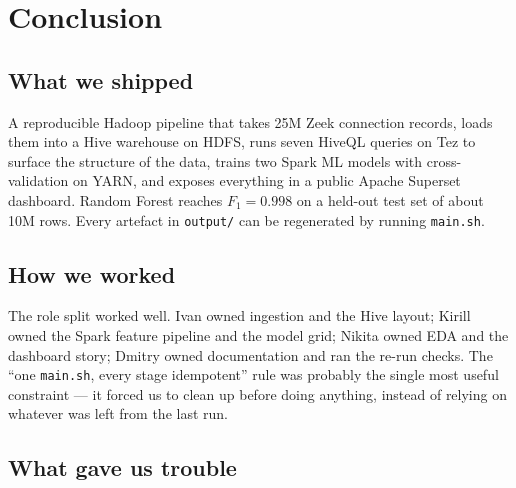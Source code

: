 \documentclass[11pt,a4paper]{article}
\begin{document}
\section{Conclusion}

\subsection{What we shipped}

A reproducible Hadoop pipeline that takes 25M Zeek connection records,
loads them into a Hive warehouse on HDFS, runs seven HiveQL queries on
Tez to surface the structure of the data, trains two Spark ML models with
cross-validation on YARN, and exposes everything in a public Apache
Superset dashboard. Random Forest reaches $F_1 = 0.998$ on a held-out
test set of about 10M rows. Every artefact in \texttt{output/} can be
regenerated by running \texttt{main.sh}.

\subsection{How we worked}

The role split worked well. Ivan owned ingestion and the Hive layout;
Kirill owned the Spark feature pipeline and the model grid; Nikita owned
EDA and the dashboard story; Dmitry owned documentation and ran the
re-run checks. The ``one \texttt{main.sh}, every stage idempotent'' rule
was probably the single most useful constraint --- it forced us to
clean up before doing anything, instead of relying on whatever was left
from the last run.

\subsection{What gave us trouble}
\end{document}
